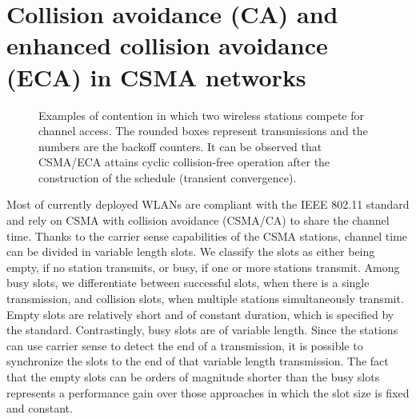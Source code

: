 \documentclass[journal]{IEEEtran}
\begin{document}
\section{Collision avoidance (CA) and enhanced collision avoidance (ECA) in CSMA networks}
\label{sec:eca}

\begin{figure}[!t]
\centering
{}
\caption{Examples of contention in which two wireless stations compete for channel access. The rounded boxes represent transmissions and the numbers are the backoff counters. It can be observed that CSMA/ECA attains cyclic collision-free operation after the construction of the schedule (transient convergence).}
\label{fig:ca_vs_eca}
\end{figure}

Most of currently deployed WLANs are compliant with the IEEE 802.11 standard and rely on CSMA with collision avoidance (CSMA/CA) to share the channel time.
Thanks to the carrier sense capabilities of the CSMA stations, channel time can be divided in variable length slots.
We classify the slots as either being empty, if no station transmits, or busy, if one or more stations transmit.
Among busy slots, we differentiate between successful slots, when there is a single transmission, and collision slots, when multiple stations simultaneously transmit.
Empty slots are relatively short and of constant duration, which is specified by the standard.
Contrastingly, busy slots are of variable length. 
Since the stations can use carrier sense to detect the end of a transmission, it is possible to synchronize the slots to the end of that variable length transmission.
The fact that the empty slots can be orders of magnitude shorter than the busy slots represents a performance gain over those approaches in which the slot size is fixed and constant.
\end{document}
